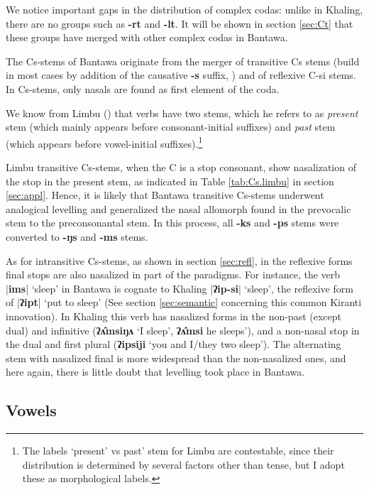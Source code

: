 \documentclass[oneside,a4paper,11pt]{article}
\newcommand{\ipa}[1]{\textbf{{\phon\mbox{#1}}}} %
\newcommand{\dhatu}[2]{|\ipa{#1}| `#2'}
\begin{document}
We notice important gaps in the distribution of complex codas: unlike in Khaling, there are no groups such as \ipa{-rt} and \ipa{-lt}. It will be shown in section \ref{sec:Ct} that these groups have merged with other complex codas in Bantawa.

The Cs-stems of Bantawa originate from the merger of transitive Cs stems (build in most cases by addition of the causative \ipa{-s} suffix, \citealt{michailovsky85dental}) and of reflexive C-si stems. In Cs-stems, only nasals are found as first element of the coda. 

We know from Limbu (\citealt[xiii]{michailovsky02dico}) that verbs have two stems, which he refers to as \textit{present} stem (which mainly appears before consonant-initial suffixes) and \textit{past} stem (which appears before vowel-initial suffixes).\footnote{The labels `present' vs  past' stem for Limbu are contestable, since their distribution is determined by several factors other than tense, but I adopt these as morphological labels.}

Limbu transitive Cs-stems, when the C is a stop consonant, show nasalization of the stop in the present stem, as indicated in Table \ref{tab:Cs.limbu} in section \ref{sec:appl}. Hence, it is likely that Bantawa transitive Cs-stems underwent analogical levelling and generalized the nasal allomorph found in the prevocalic stem to the preconsonantal stem.  In this process, all \ipa{-ks} and \ipa{-ps} stems were converted to \ipa{-ŋs} and \ipa{-ms} stems.

As for intransitive Cs-stems, as shown in section \ref{sec:refl}, in the reflexive forms final stops are also nasalized in part of the paradigms. For instance, the verb \dhatu{ims}{sleep} in Bantawa is cognate to Khaling \dhatu{ʔip-si}{sleep}, the reflexive form of \dhatu{ʔipt}{put to sleep} (See section \ref{sec:semantic} concerning this common Kiranti innovation). In Khaling this verb has nasalized forms in the non-past (except dual) and infinitive (\ipa{ʔʌ̂msiŋʌ} `I sleep', \ipa{ʔʌ̂msi} he sleeps'), and a non-nasal stop in the dual and first plural (\ipa{ʔipsiji} `you and I/they two sleep'). The alternating stem with nasalized final is more widespread than the non-nasalized ones, and here again, there is little doubt that levelling took place in Bantawa.

\subsection{Vowels} \label{sec:vowels}
\end{document}
